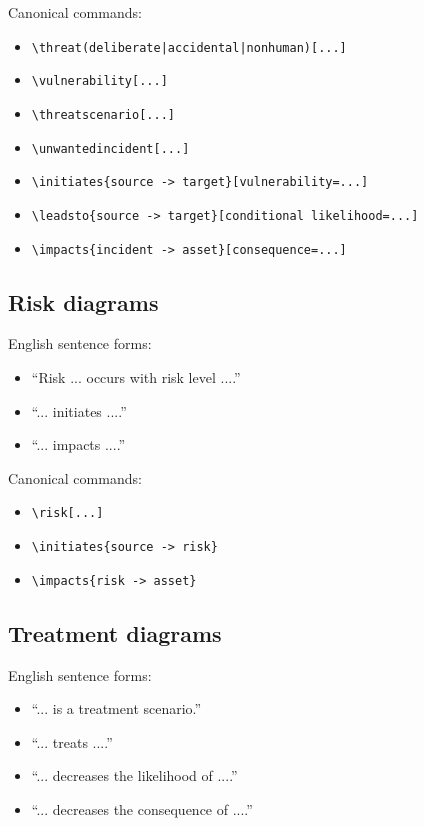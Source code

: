 \documentclass[a4paper]{article}
\begin{document}
Canonical commands:

\begin{itemize}
  \item \texttt{\textbackslash threat(deliberate|accidental|nonhuman)[...]}
  \item \texttt{\textbackslash vulnerability[...]}
  \item \texttt{\textbackslash threatscenario[...]}
  \item \texttt{\textbackslash unwantedincident[...]}
  \item \texttt{\textbackslash initiates\{source -> target\}[vulnerability=...]}
  \item \texttt{\textbackslash leadsto\{source -> target\}[conditional likelihood=...]}
  \item \texttt{\textbackslash impacts\{incident -> asset\}[consequence=...]}
\end{itemize}

\subsection{Risk diagrams}

English sentence forms:

\begin{itemize}
  \item ``Risk ... occurs with risk level ....''
  \item ``... initiates ....''
  \item ``... impacts ....''
\end{itemize}

Canonical commands:

\begin{itemize}
  \item \texttt{\textbackslash risk[...]}
  \item \texttt{\textbackslash initiates\{source -> risk\}}
  \item \texttt{\textbackslash impacts\{risk -> asset\}}
\end{itemize}

\subsection{Treatment diagrams}

English sentence forms:

\begin{itemize}
  \item ``... is a treatment scenario.''
  \item ``... treats ....''
  \item ``... decreases the likelihood of ....''
  \item ``... decreases the consequence of ....''
\end{itemize}
\end{document}

